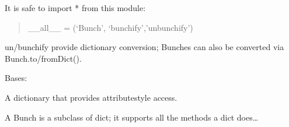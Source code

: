 \documentclass[letterpaper,10pt,english]{sphinxmanual}
\begin{document}
\sphinxAtStartPar
It is safe to import * from this module:
\begin{quote}

\sphinxAtStartPar
\_\_all\_\_ = (‘Bunch’, ‘bunchify’,’unbunchify’)
\end{quote}

\sphinxAtStartPar
un/bunchify provide dictionary conversion; Bunches can also be
converted via Bunch.to/fromDict().

\begin{fulllineitems}
\label{\detokenize{pgamit.classes:pgamit.classes.pyBunch.Bunch}}
\pysigstartsignatures
\pysigline
{}
\pysigstopsignatures
\sphinxAtStartPar
Bases: 

\sphinxAtStartPar
A dictionary that provides attribute\sphinxhyphen{}style access.

\begin{sphinxVerbatim}[commandchars=\\\{\}]
  
  
\PYG{p}{[}\PYG{p}{]}  
  
  \PYG{p}{[}\PYG{p}{]}
\end{sphinxVerbatim}

\sphinxAtStartPar
A Bunch is a subclass of dict; it supports all the methods a dict does…


\end{fulllineitems}
\end{document}
